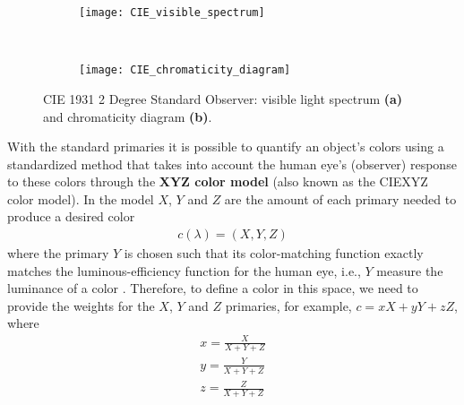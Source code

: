 \begin{figure}[!ht]
    \centering
    \begin{subfigure}[c]{0.65\textwidth}
        \texttt{[image: CIE\_visible\_spectrum]}
        \caption{}
        \label{fig:visual_spectrum}
    \end{subfigure}\\
    \begin{subfigure}[c]{0.65\textwidth}
        \texttt{[image: CIE\_chromaticity\_diagram]}
        \caption{}
        \label{fig:chrom_diagram}
    \end{subfigure} 
                      
    \caption{CIE 1931 2 Degree Standard Observer: visible light spectrum {\small \textsf{\textbf{(a)}}} and chromaticity diagram {\small \textsf{\textbf{(b)}}}.}\label{fig:cie_standard_observer}    
\end{figure}

With the standard primaries it is possible to quantify an object’s colors using a standardized method that takes into account the human eye’s (observer) response to these colors through the \textbf{XYZ color model} (also known as the CIEXYZ color model). In the model $X$, $Y$ and $Z$ are the amount of each primary needed to produce a desired color
\begin{eqnarray} 
 c(\lambda) = (X,Y,Z) \label{eq:XYZ_color}
\end{eqnarray}
where the primary $Y$ is chosen such that its color-matching function exactly matches the luminous-efficiency function for the human eye, i.e., $Y$ measure the luminance of a color \citep{Wright:BookCh2:2007}. Therefore, to define a color in this space, we need to provide the weights for the $X$, $Y$ and $Z$ primaries, for example, $c =xX + yY + zZ$, where 
\begin{gather} 
	x = \frac{X}{X+Y+Z} \nonumber \\ 
	y = \frac{Y}{X+Y+Z} \label{eq:xyz_color_coords} \\ 
	z = \frac{Z}{X+Y+Z} \nonumber 
\end{gather}

